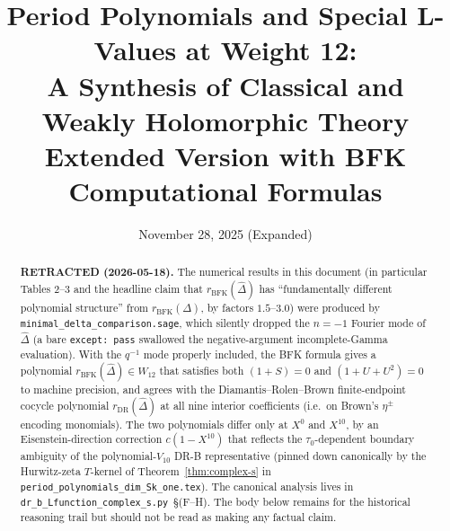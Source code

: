 \documentclass[11pt]{article}
\title{Period Polynomials and Special L-Values at Weight 12:\\
A Synthesis of Classical and Weakly Holomorphic Theory\\
{\large Extended Version with BFK Computational Formulas}}
\date{November 28, 2025 (Expanded)}
\begin{document}
\maketitle

\begin{abstract}
\textbf{RETRACTED (2026-05-18).}  The numerical results in this document
(in particular Tables 2--3 and the headline claim that
$r_{\mathrm{BFK}}(\widehat\Delta)$ has ``fundamentally different
polynomial structure'' from $r_{\mathrm{BFK}}(\Delta)$, by factors
$1.5$--$3.0$) were produced by
\texttt{minimal\_delta\_comparison.sage}, which silently dropped the
$n = -1$ Fourier mode of $\widehat\Delta$ (a bare \texttt{except: pass}
swallowed the negative-argument incomplete-Gamma evaluation).  With the
$q^{-1}$ mode properly included, the BFK formula gives a polynomial
$r_{\mathrm{BFK}}(\widehat\Delta) \in W_{12}$ that satisfies both
$(1+S) = 0$ and $(1+U+U^2) = 0$ to machine precision, and agrees with
the Diamantis--Rolen--Brown finite-endpoint cocycle polynomial
$r_{\mathrm{DR}}(\widehat\Delta)$ at all nine interior coefficients
(i.e.\ on Brown's $\eta^\pm$ encoding monomials).  The two polynomials
differ only at $X^0$ and $X^{10}$, by an Eisenstein-direction
correction $c(1 - X^{10})$ that reflects the $\tau_0$-dependent
boundary ambiguity of the polynomial-$V_{10}$ DR-B representative
(pinned down canonically by the Hurwitz-zeta $T$-kernel of
Theorem~\ref{thm:complex-s} in
\texttt{period\_polynomials\_dim\_Sk\_one.tex}).  The canonical
analysis lives in
\texttt{dr\_b\_Lfunction\_complex\_s.py}~\S(F--H).  The body below
remains for the historical reasoning trail but should not be read as
making any factual claim.
\end{abstract}
\end{document}
